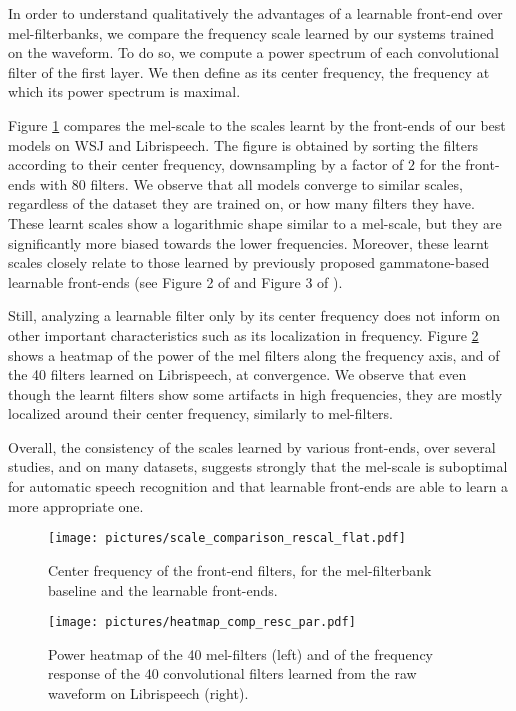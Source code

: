 \documentclass[a4paper]{article}
\begin{document}
In order to understand qualitatively the advantages of a learnable front-end over mel-filterbanks, we compare the frequency scale learned by our systems trained on the waveform. To do so, we compute a power spectrum of each convolutional filter of the first layer. We then define as its center frequency, the frequency at which its power spectrum is maximal. 

Figure \ref{fig:scale_comp} compares the mel-scale to the scales learnt by the 
front-ends of our best models on WSJ and Librispeech.
The figure is obtained by sorting the filters according to their center frequency, downsampling by a factor of $2$ for the front-ends with $80$ filters.
We observe that all 
models converge to 
similar scales, regardless of the dataset they are trained on, or how many filters they have. These learnt scales show a logarithmic shape similar to a mel-scale, but 
they are significantly more biased towards the lower frequencies. Moreover, these learnt scales closely relate to those learned by previously proposed gammatone-based learnable front-ends (see Figure 2 of \cite{hoshen2015speech} and Figure 3 of \cite{sainath2015learning}).

Still, analyzing a learnable filter only by its center frequency does not inform on other important characteristics such as its localization in frequency. Figure \ref{fig:heat_comp} shows a heatmap of the power of the mel filters along the frequency axis, and of the 40 filters learned on Librispeech, at convergence. We observe that even though the learnt filters show some artifacts in high frequencies, they are mostly localized around their center frequency, similarly to mel-filters. 

Overall, the consistency of the scales learned by various front-ends, over several studies, and on many datasets, suggests strongly that the mel-scale is suboptimal for automatic speech recognition and that learnable front-ends are able to learn a more appropriate one.

\begin{figure}[t]
  \texttt{[image: pictures/scale\_comparison\_rescal\_flat.pdf]}
  \caption{Center frequency of the front-end filters, for the mel-filterbank baseline and the learnable front-ends.}
  \label{fig:scale_comp}
\end{figure}

\begin{figure}[t]
  \texttt{[image: pictures/heatmap\_comp\_resc\_par.pdf]}
  \caption{Power heatmap of the 40 mel-filters (left) and of the frequency response of the 40 convolutional filters learned from the raw waveform on Librispeech (right).}
  \label{fig:heat_comp}
\end{figure}
\end{document}
